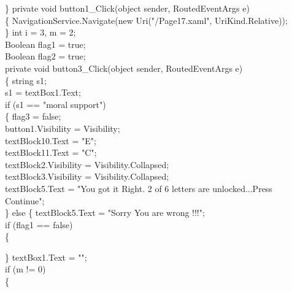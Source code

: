 {{        \}
        private void button1_Click(object sender, RoutedEventArgs e)\\
        \{
            NavigationService.Navigate(new Uri("/Page17.xaml", UriKind.Relative));\\
        \}
        int i = 3, m = 2;\\
        Boolean flag1 = true;\\
        Boolean flag2 = true;\\
        private void button3_Click(object sender, RoutedEventArgs e)\\
        \{
            string s1;\\
            s1 = textBox1.Text;\\
            if (s1 == "moral support")\\
            \{
                flag3 = false;\\
                button1.Visibility = Visibility;\\
                textBlock10.Text = "E";\\
                textBlock11.Text = "C";\\
                textBlock2.Visibility = Visibility.Collapsed;\\
                textBlock3.Visibility = Visibility.Collapsed;\\
                textBlock5.Text = "You got it Right. 2 of 6 letters are unlocked...Press Continue";\\
            \}
            else
            \{
                textBlock5.Text = "Sorry You are wrong !!!";\\
                if (flag1 == false)\\
                \{

                    
                \}
                textBox1.Text = "";\\
                if (m != 0)\\
                \{

}}
